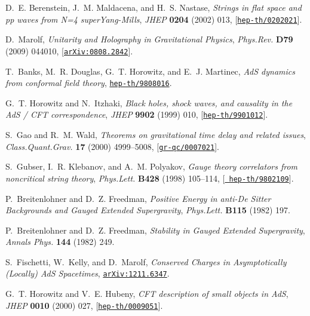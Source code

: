\documentclass[12pt,a4paper]{article}
\begin{document}
\begin{thebibliography}{100}
D.~E. Berenstein, J.~M. Maldacena, and H.~S. Nastase, {\it {Strings in flat
  space and pp waves from N=4 superYang-Mills}},  {\em JHEP} {\bf 0204} (2002)
  013, [\href{http://xxx.lanl.gov/abs/hep-th/0202021}{{\tt hep-th/0202021}}].

D.~Marolf, {\it {Unitarity and Holography in Gravitational Physics}},  {\em
  Phys.Rev.} {\bf D79} (2009) 044010,
  [\href{http://xxx.lanl.gov/abs/0808.2842}{{\tt arXiv:0808.2842}}].

T.~Banks, M.~R. Douglas, G.~T. Horowitz, and E.~J. Martinec, {\it {AdS dynamics
  from conformal field theory}},
  \href{http://xxx.lanl.gov/abs/hep-th/9808016}{{\tt hep-th/9808016}}.

G.~T. Horowitz and N.~Itzhaki, {\it {Black holes, shock waves, and causality in
  the AdS / CFT correspondence}},  {\em JHEP} {\bf 9902} (1999) 010,
  [\href{http://xxx.lanl.gov/abs/hep-th/9901012}{{\tt hep-th/9901012}}].

S.~Gao and R.~M. Wald, {\it {Theorems on gravitational time delay and related
  issues}},  {\em Class.Quant.Grav.} {\bf 17} (2000) 4999--5008,
  [\href{http://xxx.lanl.gov/abs/gr-qc/0007021}{{\tt gr-qc/0007021}}].

S.~Gubser, I.~R. Klebanov, and A.~M. Polyakov, {\it {Gauge theory correlators
  from noncritical string theory}},  {\em Phys.Lett.} {\bf B428} (1998)
  105--114, [\href{http://xxx.lanl.gov/abs/hep-th/9802109}{{\tt
  hep-th/9802109}}].

P.~Breitenlohner and D.~Z. Freedman, {\it {Positive Energy in anti-De Sitter
  Backgrounds and Gauged Extended Supergravity}},  {\em Phys.Lett.} {\bf B115}
  (1982) 197.

P.~Breitenlohner and D.~Z. Freedman, {\it {Stability in Gauged Extended
  Supergravity}},  {\em Annals Phys.} {\bf 144} (1982) 249.

S.~Fischetti, W.~Kelly, and D.~Marolf, {\it {Conserved Charges in
  Asymptotically (Locally) AdS Spacetimes}},
  \href{http://xxx.lanl.gov/abs/1211.6347}{{\tt arXiv:1211.6347}}.

G.~T. Horowitz and V.~E. Hubeny, {\it {CFT description of small objects in
  AdS}},  {\em JHEP} {\bf 0010} (2000) 027,
  [\href{http://xxx.lanl.gov/abs/hep-th/0009051}{{\tt hep-th/0009051}}].


\end{thebibliography}
\end{document}
